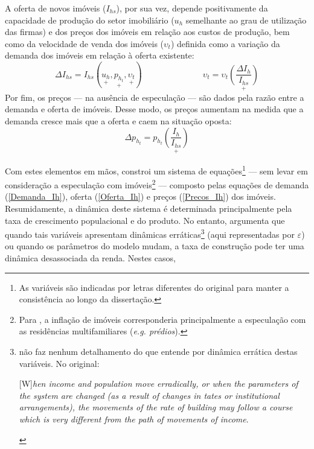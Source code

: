 A oferta de novos imóveis ($I_{hs}$), por sua vez, 
depende positivamente da capacidade de produção do setor imobiliário ($u_h$ semelhante ao grau de utilização das firmas) e dos preços dos imóveis em relação aos custos de produção, bem como da velocidade de venda dos imóveis ($\upsilon_t$) definida como a variação da demanda dos imóveis em relação à oferta existente:
\begin{equation}
\label{Oferta_Ih}
\Delta I_{hs} =  I_{hs}(\underset{+}{u_h}, \underset{+}{p_{h_t}}, \underset{+}{\upsilon_t}) \hspace{3cm} \upsilon_t = \upsilon_t\underset{+}{\left(\frac{\Delta I_h}{I_{hs}}\right)}
\end{equation}
Por fim, os preços --- na ausência de especulação --- são dados pela razão entre a demanda e oferta de imóveis.
Desse modo, os preços aumentam na medida que a demanda cresce mais que a oferta e caem na situação oposta:
\begin{equation}
\label{Precos_Ih}
\Delta p_{h_t} = p_{h_t}\underset{+}{\left(\frac{I_{h}}{I_{hs}}\right)}
\end{equation}

Com estes elementos em mãos, \textcite{duesenberry_investment_1958} constroi um sistema de equações\footnote{As variáveis são indicadas por letras diferentes do original para manter a consistência ao longo da dissertação.}  --- sem levar em consideração a especulação com imóveis\footnote{Para \textcite{duesenberry_investment_1958}, a inflação de imóveis corresponderia principalmente a especulação com as residências multifamiliares (\textit{e.g. prédios}).} ---  composto pelas equações de demanda (\ref{Demanda_Ih}), oferta (\ref{Oferta_Ih}) e preços (\ref{Precos_Ih}) dos imóveis.
Resumidamente, a dinâmica deste sistema é determinada principalmente pela taxa de crescimento populacional e do produto. No entanto, \textcite{duesenberry_investment_1958} argumenta que quando tais variáveis apresentam dinâmicas erráticas\footnote{\textcite[p.~158]{duesenberry_investment_1958} não faz nenhum detalhamento do que entende por dinâmica errática destas variáveis. No original:

\begin{citacao}

[W]\textit{hen income and population move erradically, or when the parameters of the system are changed (as a result of changes in tates or institutional arrangements), the movements of the rate of building may follow a course which is very different from the path of movements of income}.
\end{citacao}

} (aqui representadas por $\varepsilon$) ou quando os parâmetros do modelo mudam, a taxa de construção pode ter uma dinâmica desassociada da renda. Nestes casos,

